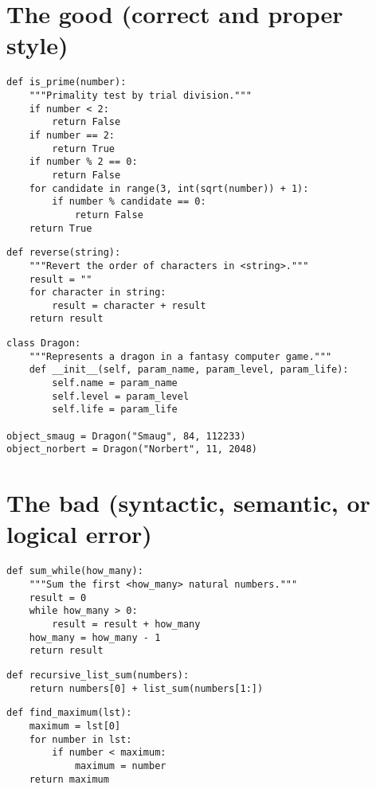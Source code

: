 \documentclass[12pt,a4paper]{article}
\begin{document}
\section*{The good (correct and proper style)}

\begin{lstlisting}
def is_prime(number):
    """Primality test by trial division."""
    if number < 2:
        return False
    if number == 2:
        return True
    if number % 2 == 0:
        return False
    for candidate in range(3, int(sqrt(number)) + 1):
        if number % candidate == 0:
            return False
    return True
\end{lstlisting}

\begin{lstlisting}
def reverse(string):
    """Revert the order of characters in <string>."""
    result = ""
    for character in string:
        result = character + result
    return result
\end{lstlisting}

\begin{lstlisting}
class Dragon:
    """Represents a dragon in a fantasy computer game."""
    def __init__(self, param_name, param_level, param_life):
        self.name = param_name
        self.level = param_level
        self.life = param_life

object_smaug = Dragon("Smaug", 84, 112233)
object_norbert = Dragon("Norbert", 11, 2048)
\end{lstlisting}

\section*{The bad (syntactic, semantic, or logical error)}

\begin{lstlisting}
def sum_while(how_many):
    """Sum the first <how_many> natural numbers."""
    result = 0
    while how_many > 0:
        result = result + how_many
    how_many = how_many - 1
    return result
\end{lstlisting}

\begin{lstlisting}
def recursive_list_sum(numbers):
    return numbers[0] + list_sum(numbers[1:])
\end{lstlisting}

\begin{lstlisting}
def find_maximum(lst):
    maximum = lst[0]
    for number in lst:
        if number < maximum:
            maximum = number
    return maximum
\end{lstlisting}
\end{document}
